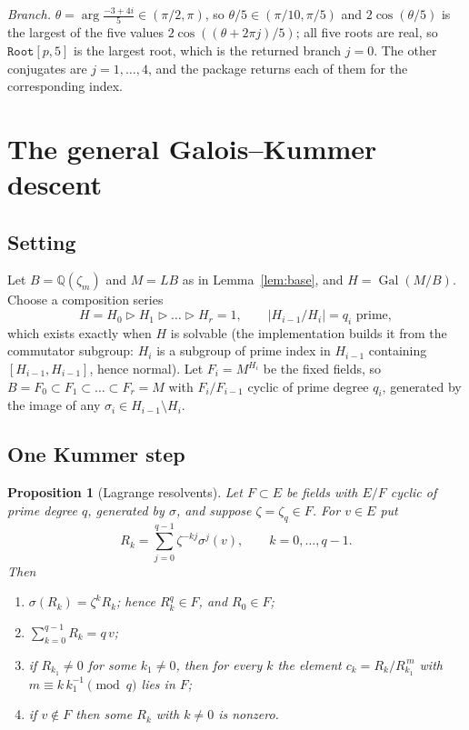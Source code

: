 \documentclass[11pt,a4paper]{article}
\newtheorem{proposition}[theorem]{Proposition}
\theoremstyle{definition}
\theoremstyle{remark}
\newcommand{\Q}{\mathbb{Q}}
\newcommand{\Gal}{\operatorname{Gal}}
\newcommand{\code}[1]{\texttt{#1}}
\newcommand{\Root}{\code{Root}}
\begin{document}
\emph{Branch.}  $\theta=\arg\tfrac{-3+4i}{5}\in(\pi/2,\pi)$, so $\theta/5\in(\pi/10,\pi/5)$
and $2\cos(\theta/5)$ is the largest of the five values $2\cos((\theta+2\pi j)/5)$; all
five roots are real, so $\Root[p,5]$ is the largest root, which is the returned
branch $j=0$.  The other conjugates are $j=1,\dots,4$, and the package returns each of
them for the corresponding index.

\section{The general Galois--Kummer descent}\label{sec:descent}

\subsection{Setting}

Let $B=\Q(\zeta_m)$ and $M=LB$ as in Lemma~\ref{lem:base}, and $H=\Gal(M/B)$.  Choose a
composition series
\[
H=H_0\rhd H_1\rhd\dots\rhd H_r=1,\qquad |H_{i-1}/H_i|=q_i\text{ prime},
\]
which exists exactly when $H$ is solvable (the implementation builds it from the
commutator subgroup: $H_i$ is a subgroup of prime index in $H_{i-1}$ containing
$[H_{i-1},H_{i-1}]$, hence normal).  Let $F_i=M^{H_i}$ be the fixed fields, so
$B=F_0\subset F_1\subset\dots\subset F_r=M$ with $F_i/F_{i-1}$ cyclic of prime degree
$q_i$, generated by the image of any $\sigma_i\in H_{i-1}\setminus H_i$.

\subsection{One Kummer step}

\begin{proposition}[Lagrange resolvents]\label{prop:lagrange}
Let $F\subset E$ be fields with $E/F$ cyclic of prime degree $q$, generated by $\sigma$,
and suppose $\zeta=\zeta_q\in F$.  For $v\in E$ put
\[
R_k=\sum_{j=0}^{q-1}\zeta^{-kj}\sigma^j(v),\qquad k=0,\dots,q-1 .
\]
Then
\begin{enumerate}[nosep]
\item[(i)] $\sigma(R_k)=\zeta^kR_k$; hence $R_k^q\in F$, and $R_0\in F$;
\item[(ii)] $\sum_{k=0}^{q-1}R_k=q\,v$;
\item[(iii)] if $R_{k_1}\neq0$ for some $k_1\neq0$, then for every $k$ the element
$c_k=R_k/R_{k_1}^{\,m}$ with $m\equiv k\,k_1^{-1}\pmod q$ lies in $F$;
\item[(iv)] if $v\notin F$ then some $R_k$ with $k\neq0$ is nonzero.
\end{enumerate}
\end{proposition}
\end{document}
